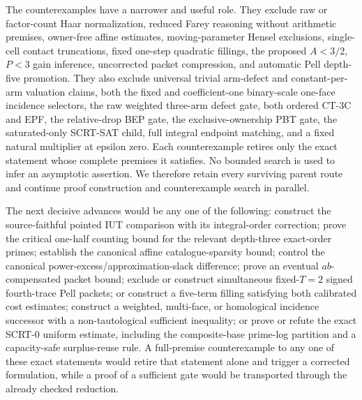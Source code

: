 \documentclass[11pt]{amsart}
\theoremstyle{definition}
\theoremstyle{remark}
\begin{document}
The counterexamples have a narrower and useful role.  They exclude raw or
factor-count Haar normalization, reduced Farey reasoning without arithmetic
premises, owner-free affine estimates, moving-parameter Hensel exclusions,
single-cell contact truncations, fixed one-step quadratic fillings, the
proposed $A<3/2$, $P<3$ gain inference, uncorrected packet compression, and automatic Pell
depth-five promotion.  They also exclude universal trivial arm-defect and
constant-per-arm valuation claims, both the fixed and coefficient-one
binary-scale one-face incidence selectors, the raw weighted three-arm
defect gate, both ordered CT-3C and EPF, the relative-drop BEP gate, the
exclusive-ownership PBT gate, the saturated-only SCRT-SAT child, full integral
endpoint matching, and a fixed natural multiplier at epsilon zero.
Each counterexample retires only the exact statement
whose complete premises it satisfies.  No bounded search is used to infer an
asymptotic assertion.  We therefore retain every surviving parent route and
continue proof construction and counterexample search in parallel.

The next decisive advances would be any one of the following: construct the
source-faithful pointed IUT comparison with its integral-order correction;
prove the critical one-half counting bound for the relevant depth-three
exact-order primes; establish the canonical affine catalogue-sparsity bound;
control the canonical power-excess/approximation-slack difference; prove an
eventual $ab$-compensated packet bound; exclude or construct simultaneous
fixed-$T=2$ signed fourth-trace Pell packets; or construct a five-term filling
satisfying both calibrated cost estimates; construct a weighted, multi-face,
or homological incidence successor with a non-tautological sufficient
inequality; or prove or refute the exact SCRT-0 uniform estimate, including
the composite-base prime-log partition and a capacity-safe surplus-reuse
rule.  A
full-premise counterexample to any one of these exact statements would retire
that statement alone and trigger a corrected formulation, while a proof of a
sufficient gate would be transported through the already checked reduction.
\end{document}
